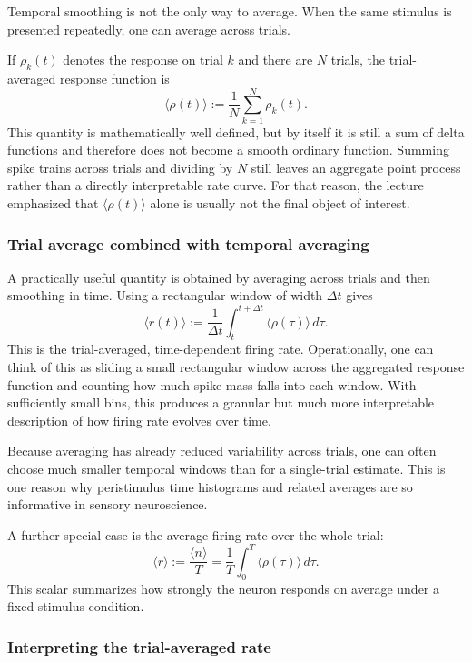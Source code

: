 \documentclass[11pt]{article}
\begin{document}
Temporal smoothing is not the only way to average. When the same stimulus is presented repeatedly, one can average across trials.

If $\rho_k(t)$ denotes the response on trial $k$ and there are $N$ trials, the trial-averaged response function is
\[
\langle \rho(t) \rangle := \frac{1}{N}\sum_{k=1}^{N} \rho_k(t).
\]
This quantity is mathematically well defined, but by itself it is still a sum of delta functions and therefore does not become a smooth ordinary function. Summing spike trains across trials and dividing by $N$ still leaves an aggregate point process rather than a directly interpretable rate curve. For that reason, the lecture emphasized that $\langle \rho(t) \rangle$ alone is usually not the final object of interest.

\subsubsection{Trial average combined with temporal averaging}

A practically useful quantity is obtained by averaging across trials and then smoothing in time. Using a rectangular window of width $\Delta t$ gives
\[
\langle r(t) \rangle := \frac{1}{\Delta t}
\int_t^{t+\Delta t} \langle \rho(\tau) \rangle\,d\tau.
\]
This is the trial-averaged, time-dependent firing rate. Operationally, one can think of this as sliding a small rectangular window across the aggregated response function and counting how much spike mass falls into each window. With sufficiently small bins, this produces a granular but much more interpretable description of how firing rate evolves over time.

Because averaging has already reduced variability across trials, one can often choose much smaller temporal windows than for a single-trial estimate. This is one reason why peristimulus time histograms and related averages are so informative in sensory neuroscience.

A further special case is the average firing rate over the whole trial:
\[
\langle r \rangle := \frac{\langle n \rangle}{T}
= \frac{1}{T}\int_0^T \langle \rho(\tau) \rangle\,d\tau.
\]
This scalar summarizes how strongly the neuron responds on average under a fixed stimulus condition.

\subsubsection{Interpreting the trial-averaged rate}
\end{document}
